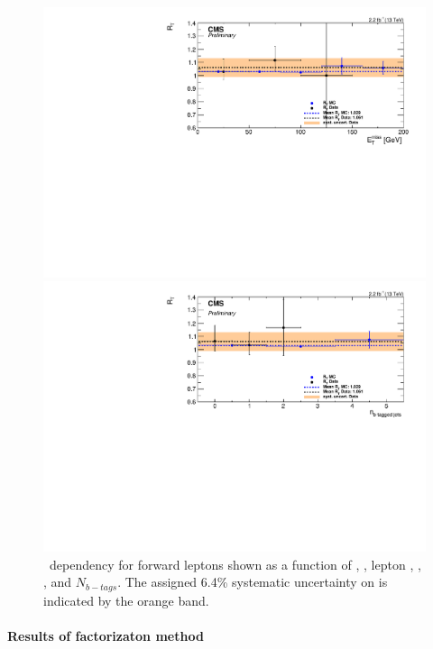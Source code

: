 \begin{figure}[htbp]
\begin{minipage}[t]{0.3\textwidth}
    \includegraphics[width=\textwidth]{bkgd/figs/Triggereff_SFvsOF_Syst_PFHT_HighHTExclusiveForward_Run2015_25ns_MET_None_NonIso_MC.pdf}
  \end{minipage}
  \begin{minipage}[t]{0.3\textwidth}
    \includegraphics[width=\textwidth]{bkgd/figs/Triggereff_SFvsOF_Syst_PFHT_HighHTExclusiveForward_Run2015_25ns_NBJets_None_NonIso_MC.pdf}
  \end{minipage}
  \caption{
    \rt\ dependency for forward leptons shown as a function of \nj, \nvtx, lepton \pt, \mll, \MET, and $N_{b-tags}$.
    The assigned 6.4\% systematic uncertainty on \rt is indicated by the orange band.
  }
  \label{fig:EffDependencyEndcap}
\end{figure}

\paragraph*{Results of factorizaton method}\mbox{}

